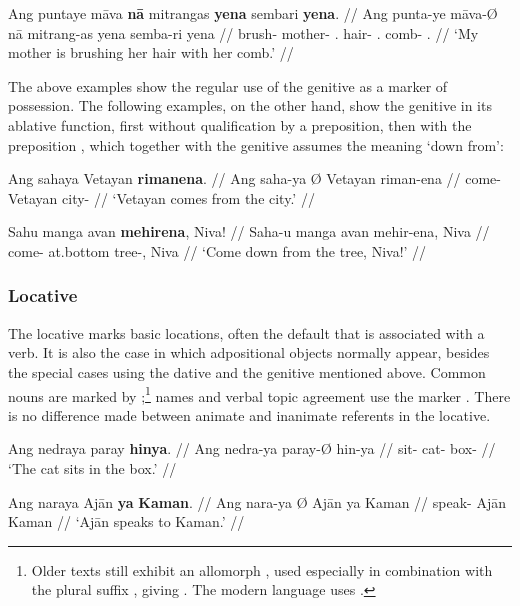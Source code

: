 \ex\begingl
	\gla Ang puntaye māva \textbf{nā} mitrangas \textbf{yena} sembari 
		\textbf{yena}. //
	\glb Ang punta-ye māva-Ø nā mitrang-as yena semba-ri 
		yena //
	\glc \AgtT{} brush-\TsgF{} mother-\Top{} \Fsg{}.\Gen{} hair-\Parg{} 
		\TsgF{}.\Gen{} comb-\Ins{} \TsgF{}.\Gen{} //
	\glft `My mother is brushing her hair with her comb.' //
\endgl\xe

The above examples show the regular use of the genitive as a marker of
possession. The following examples, on the other hand, show the genitive in its
ablative function, first without qualification by a preposition, then with the
preposition , which together with the
genitive assumes the meaning `down from':

\pex
\a\begingl
	\gla Ang sahaya {} Vetayan \textbf{rimanena}. //
	\glb Ang saha-ya Ø Vetayan riman-ena //
	\glc \AgtT{} come-\TsgM{} \Top{} Vetayan city-\Gen{} //
	\glft `Vetayan comes from the city.' //
\endgl

\a\begingl
	\gla Sahu manga avan \textbf{mehirena}, Niva! //
	\glb Saha-u manga avan mehir-ena, Niva //
	\glc come-\Imp{} \Dyn{} at.bottom tree-\Gen{}, Niva //
	\glft `Come down from the tree, Niva!' //
\endgl

\xe


\subsubsection{Locative}

The locative marks basic locations, often the default that is associated with a
verb. It is also the case in which adpositional objects normally appear,
besides the special cases using the dative and the genitive mentioned above.
Common nouns are marked by ;\footnote{Older texts still exhibit
an allomorph , used especially in combination with the plural
suffix , giving . The modern language uses
.} names and verbal topic agreement use the marker 
. There is no difference made between animate and inanimate 
referents in the locative.

\pex\label{ex:locplain}
\a\label{ex:locnedra}\begingl
	\gla Ang nedraya paray \textbf{hinya}. //
	\glb Ang nedra-ya paray-Ø hin-ya //
	\glc \AgtT{} sit-\TsgM{} cat-\Top{} box-\Loc{} //
	\glft `The cat sits in the box.' //
\endgl

\a\label{ex:locnara}\begingl
	\gla Ang naraya {} Ajān \textbf{ya} \textbf{Kaman}. //
	\glb Ang nara-ya Ø Ajān ya Kaman //
	\glc \AgtT{} speak-\TsgM{} \Top{} Ajān \Loc{} Kaman //
	\glft `Ajān speaks to Kaman.' //
\endgl

